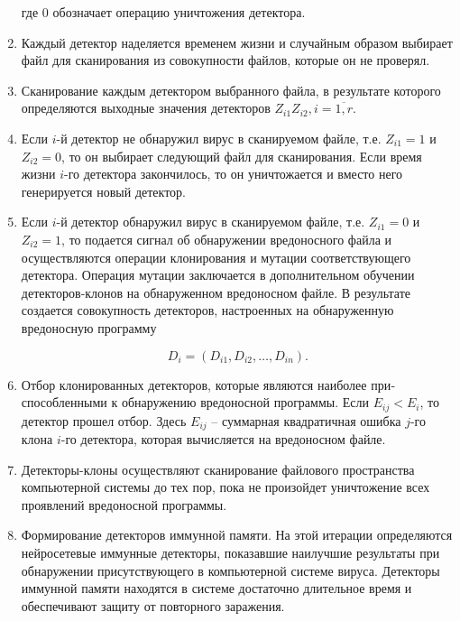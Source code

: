 \documentclass[bachelor, och, referat]{template}
\begin{document}
\begin{enumerate}
    где 0 обозначает операцию уничтожения детектора.

    \item Каждый детектор наделяется временем жизни и случайным образом
    выбирает файл для сканирования из совокупности файлов, которые он не
    проверял.
    \item Сканирование каждым детектором выбранного файла, в результате
    которого определяются выходные значения детекторов $Z_{i1} Z_{i2}, i = \overline{1, r}$.
    \item Если $i$-й детектор не обнаружил вирус в сканируемом файле, т.е.
    $Z_{i1} = 1$ и $Z_{i2} = 0$, то он выбирает следующий файл для сканирования. Если
    время жизни $i$-го детектора закончилось, то он уничтожается и вместо
    него генерируется новый детектор.
    \item Если $i$-й детектор обнаружил вирус в сканируемом файле, т.е. $Z_{i1} = 0$
    и $Z_{i2} = 1$, то подается сигнал об обнаружении вредоносного файла и осуществляются 
    операции клонирования и мутации соответствующего детектора. 
    Операция мутации заключается в дополнительном обучении детекто­ров-клонов 
    на обнаруженном вредоносном файле. В результате создается
    совокупность детекторов, настроенных на обнаруженную вредоносную
    программу
    
    \begin{equation*}
        D_i = (D_{i1}, D_{i2}, \dots, D_{in}).
    \end{equation*}

    \item Отбор клонированных детекторов, которые являются наиболее при­
    способленными к обнаружению вредоносной программы. Если $E_{ij} < E_i$, то
    детектор прошел отбор. Здесь $E_{ij}$ -- суммарная квадратичная ошибка $j$-го
    клона $i$-го детектора, которая вычисляется на вредоносном файле.
    \item Детекторы-клоны осуществляют сканирование файлового про­странства 
    компьютерной системы до тех пор, пока не произойдет уничто­жение 
    всех проявлений вредоносной программы.
    \item Формирование детекторов иммунной памяти. На этой итерации
    определяются нейросетевые иммунные детекторы, показавшие наилучшие 
    результаты при обнаружении присутствующего в компьютерной системе вируса. 
    Детекторы иммунной памяти находятся в системе достаточ­но 
    длительное время и обеспечивают защиту от повторного заражения.
\end{enumerate}
    
\end{document}
